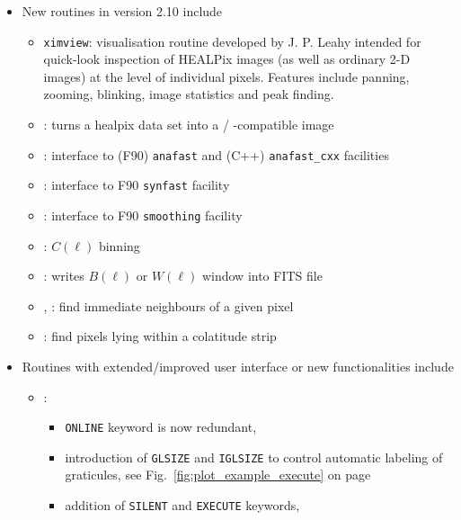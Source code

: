 \documentclass[12pt,twoside]{article}
\begin{document}
{\begin{itemize}
%
\item New routines in version 2.10 include
\begin{itemize} %
 \item {{\tt ximview}}: visualisation routine developed by J. P. Leahy intended for quick-look inspection of HEALPix images 
(as well as ordinary 2-D images) at the level of individual pixels. Features
include panning, zooming, blinking, image statistics and peak finding.
 \item {}: turns a healpix data set into a
%
/%
%
-compatible image
 \item {}: interface to (F90) {\tt anafast}
and (C++) {\tt anafast\_cxx} facilities 
 \item {}: interface to F90 {\tt synfast} facility
 \item {}: interface to F90 {\tt smoothing} facility
 \item {}: $C(\ell)$ binning
 \item {}: writes $B(\ell)$ or $W(\ell)$ window into
FITS file
 \item {}, %
       : %
   find immediate neighbours of a given pixel
 \item {}: %
   find pixels lying within a colatitude strip
\end{itemize} %
%
\item Routines with extended/improved user interface or new functionalities include
 \begin{itemize} %
  \item {}: 
  \begin{itemize} %
   \item {\tt ONLINE} keyword is now redundant, 
   \item introduction of {\tt GLSIZE} and {\tt IGLSIZE} to
  	control automatic labeling of graticules,
	see Fig.~\ref{fig:plot_example_execute} on page~\pageref{page:plot_example_execute}
   \item addition of {\tt SILENT} and {\tt EXECUTE} keywords,

\end{itemize}
\end{itemize}
\end{itemize}}
\end{document}
